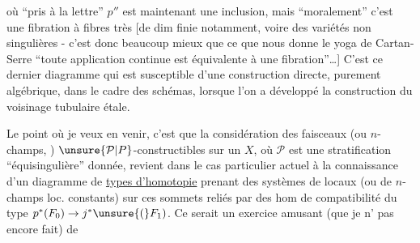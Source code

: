 où ``pris à la lettre'' $p''$ est maintenant une inclusion, mais ``moralement'' c'est  une fibration à fibres très  [de dim finie notamment, voire des variétés non singulières - c'est donc beaucoup mieux que ce que nous donne le yoga de Cartan-Serre ``toute application continue est équivalente à une fibration''\ldots] C'est ce dernier diagramme qui est susceptible d'une construction directe, purement algébrique, dans le cadre des schémas, lorsque l'on a développé la construction du voisinage tubulaire étale.

Le point où je veux en venir, c'est que la considération  des faisceaux (ou  $n$-champs, ) $\unsure{\mathcal P|P}$-constructibles sur un $X$, où $\mathcal P$ est une stratification ``équisingulière'' donnée, revient dans le cas particulier actuel à la connaissance d'un diagramme de \uline{types d'homotopie}  
 prenant des systèmes de  locaux (ou de $n$-champs loc. constants) sur ces sommets  reliés par des hom de compatibilité du type $p^*(F_0)\to j^*\unsure{(}F_1)$. Ce serait un exercice amusant (que je n' pas encore fait) de
